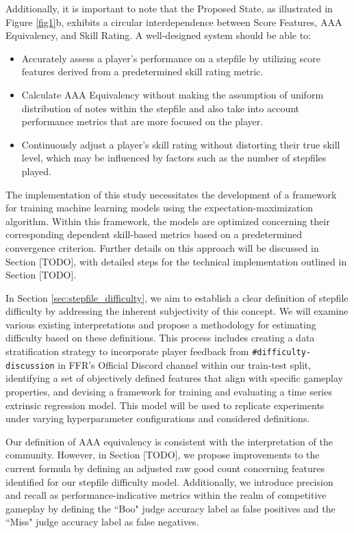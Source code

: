 Additionally, it is important to note that the Proposed State, as illustrated in Figure \ref{fig1}b, exhibits a circular interdependence between Score Features, AAA Equivalency, and Skill Rating. A well-designed system should be able to:

\begin{itemize}
	\item Accurately assess a player's performance on a stepfile by utilizing score features derived from a predetermined skill rating metric.
	\item Calculate AAA Equivalency without making the assumption of uniform distribution of notes within the stepfile and also take into account performance metrics that are more focused on the player.
	\item Continuously adjust a player's skill rating without distorting their true skill level, which may be influenced by factors such as the number of stepfiles played.
\end{itemize}

The implementation of this study necessitates the development of a framework for training machine learning models using the expectation-maximization algorithm. Within this framework, the models are optimized concerning their corresponding dependent skill-based metrics based on a predetermined convergence criterion. Further details on this approach will be discussed in Section [TODO], with detailed steps for the technical implementation outlined in Section [TODO].

\vspace{2mm}

In Section \ref{sec:stepfile_difficulty}, we aim to establish a clear definition of stepfile difficulty by addressing the inherent subjectivity of this concept. We will examine various existing interpretations and propose a methodology for estimating difficulty based on these definitions. This process includes creating a data stratification strategy to incorporate player feedback from \texttt{\#difficulty-discussion} in FFR's Official Discord channel within our train-test split, identifying a set of objectively defined features that align with specific gameplay properties, and devising a framework for training and evaluating a time series extrinsic regression model. This model will be used to replicate experiments under varying hyperparameter configurations and considered definitions.

\vspace{2mm}

Our definition of AAA equivalency is consistent with the interpretation of the community. However, in Section [TODO], we propose improvements to the current formula by defining an adjusted raw good count concerning features identified for our stepfile difficulty model. Additionally, we introduce precision and recall as performance-indicative metrics within the realm of competitive gameplay by defining the ``Boo" judge accuracy label as false positives and the ``Miss" judge accuracy label as false negatives.


